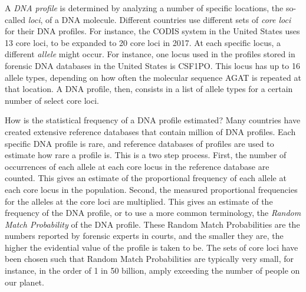 \documentclass[10pt]{article}
\begin{document}
A \textit{DNA profile} is determined by analyzing a number of specific locations, the so-called \textit{loci}, of a DNA molecule. %
Different countries use different sets of %
\textit{core loci} for their DNA profiles. 
For instance, the CODIS system in the United States uses 13 core loci, to be expanded to 20 core loci in 2017. 
At each specific locus, a different \textit{allele} might occur. 
For instance, one locus used in the profiles stored in forensic DNA databases in the United States is CSF1PO. 
This locus has up to 16 allele types, depending on how often the molecular sequence AGAT is repeated at that location. 
A DNA profile, then, consists in a list of allele types for a certain number of select core loci. 


How is the statistical frequency of a DNA profile estimated?
Many countries have created extensive reference databases that contain million of DNA profiles. 
Each specific DNA profile is rare, and reference databases of profiles 
are used to estimate 
how rare a profile 
is.
This is a two step process. First, the number of occurrences of each allele at each core locus in the reference database are counted.
This gives an estimate of the proportional frequency of each allele at each core locus in the population. Second, the measured proportional frequencies for the alleles at the core loci are 
multiplied. This gives an estimate of the frequency of the DNA profile, or to use a more common terminology, 
the \textit{Random Match Probability} of the DNA profile. %
These Random Match Probabilities are the numbers reported by forensic experts in courts, and the smaller they are, the higher the evidential value of the profile is taken to be. The sets of core loci have been chosen such that Random Match Probabilities are typically very small, for instance, in the order of 1 in 50 billion, amply exceeding the number of people on our planet. 
\end{document}
